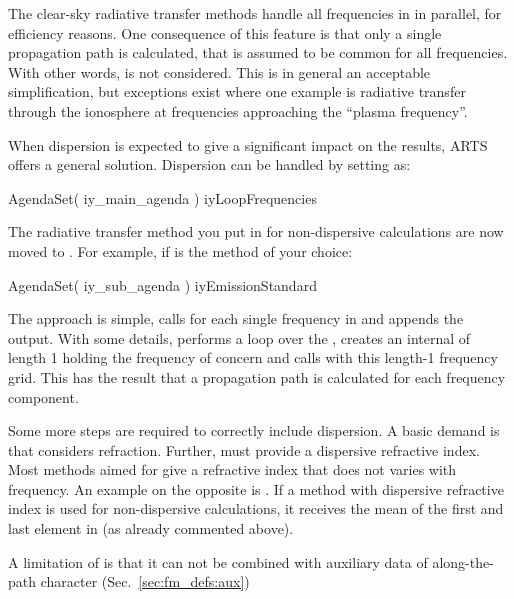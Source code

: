 The clear-sky radiative transfer methods handle all frequencies in
 in parallel, for efficiency reasons. One consequence of
this feature is that only a single propagation path is calculated, that is
assumed to be common for all frequencies. With other words,
 is not considered. This is in general an acceptable
simplification, but exceptions exist where one example is radiative
transfer through the ionosphere at frequencies approaching the ``plasma
frequency''.

When dispersion is expected to give a significant impact on the results, ARTS
offers a general solution. Dispersion can be handled by setting
 as:
\begin{code}
AgendaSet( iy_main_agenda ){
  iyLoopFrequencies
}
\end{code}
The radiative transfer method you put in  for
non-dispersive calculations are now moved to . For
example, if  is the method of your choice:
\begin{code}
AgendaSet( iy_sub_agenda ){
  iyEmissionStandard
}
\end{code}
The approach is simple,  calls
 for each single frequency in 
and appends the output. With some details, 
performs a loop over the , creates an internal
 of length 1 holding the frequency of concern and calls
 with this length-1 frequency grid. This has the
result that a propagation path is calculated for each frequency component.

Some more steps are required to correctly include dispersion. A basic demand is
that  considers refraction. Further,
 must provide a dispersive refractive
index. Most methods aimed for  give a
refractive index that does not varies with frequency. An example on the
opposite is . If a method with
dispersive refractive index is used for non-dispersive calculations, it
receives the mean of the first and last element in  (as
already commented above).

A limitation of  is that it can not be combined
with auxiliary data of along-the-path character (Sec.~\ref{sec:fm_defs:aux})






